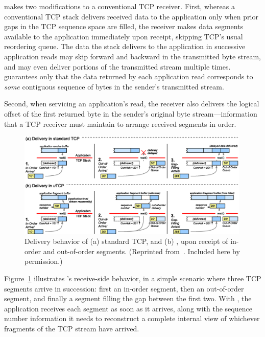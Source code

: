 \utcp makes two modifications to a conventional TCP receiver.
First, whereas a conventional TCP stack
delivers received data to the application
only when prior gaps in the TCP sequence space are filled,
the \utcp receiver
makes data segments available to the application immediately upon receipt,
skipping TCP's usual reordering queue.
The data the \utcp stack delivers to the application
in successive application reads
may skip forward and backward in the transmitted byte stream,
and \utcp may even deliver portions
of the transmitted stream multiple times.
\utcp guarantees only that the data returned by each application read
corresponds to {\em some} contiguous sequence of bytes
in the sender's transmitted stream.

Second,
when servicing an application's read,
the \utcp receiver also delivers the logical offset
of the first returned byte
in the sender's original byte stream---information 
that a TCP receiver must maintain to arrange received segments in order.

\begin{figure}[htb]
\centering
\includegraphics[width=0.99\textwidth]{figures/utcpdelivery.eps}
\caption{
Delivery behavior of (a) standard TCP, and (b) \utcp,
upon receipt of in-order and out-of-order segments.
(Reprinted from~\cite{nowlan12fitting}. Included here by permission.)}
\label{f:utcpdelivery}
\end{figure}

Figure~\ref{f:utcpdelivery} illustrates \utcp's receive-side behavior,
in a simple scenario
where three TCP segments arrive in succession:
first an in-order segment, then an out-of-order segment,
and finally a segment filling the gap between the first two.
With \utcp,
the application receives each segment as soon as it arrives,
along with the sequence number information it needs to reconstruct
a complete internal view of
whichever fragments of the TCP stream have arrived.

